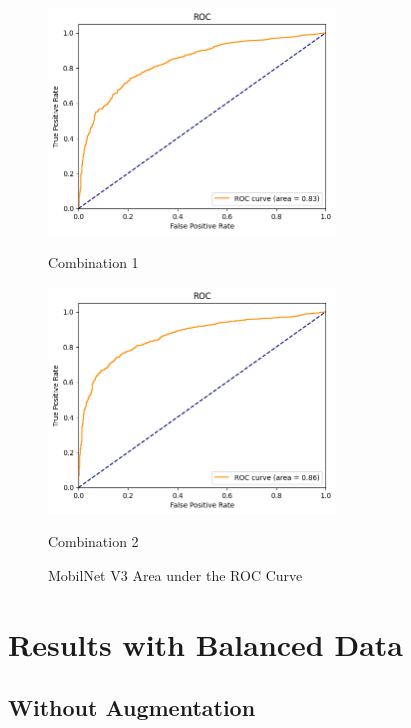 \begin{figure}[H]
    \centering
    \begin{minipage}[b]{0.49\textwidth}
        \centering
        \includegraphics[width=\textwidth, height=6cm]{Figures/unbalanced_data/without bn/mn3/roc.png}
        \captionsetup{labelformat=empty}
        \caption{Combination 1}
        \label{fig:u_wo_r_roc}
    \end{minipage}
    \hfill
    \begin{minipage}[b]{0.49\textwidth}
        \centering
        \includegraphics[width=\textwidth, height=6cm]{Figures/unbalanced_data/with bn/mn3/roc.png}
        \captionsetup{labelformat=empty}
        \caption{Combination 2}
        \label{fig:u_w_r_roc}
    \end{minipage}
    \captionsetup{labelformat=default}
    \caption{MobilNet V3 Area under the ROC Curve}
\end{figure}

\section{Results with Balanced Data}

\subsection{Without Augmentation}

